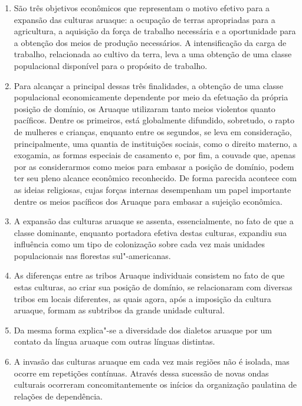 \begin{enumerate}
\def\labelenumi{\arabic{enumi}.}
\setcounter{enumi}{4}
\item
  São três objetivos econômicos que representam o motivo efetivo para a
  expansão das culturas aruaque: a ocupação de terras apropriadas para a
  agricultura, a aquisição da força de trabalho necessária e a
  oportunidade para a obtenção dos meios de produção necessários. A
  intensificação da carga de trabalho, relacionada ao cultivo da
  terra, leva a uma obtenção de uma classe populacional disponível para
  o propósito de trabalho.
\item
  Para alcançar a principal dessas três finalidades, a obtenção de uma
  classe populacional economicamente dependente por meio da efetuação da
  própria posição de domínio, os Aruaque utilizaram tanto meios
  violentos quanto pacíficos. Dentre os primeiros, está
  globalmente difundido, sobretudo, o rapto de mulheres e crianças,
  enquanto entre os segundos, se leva em consideração,
  principalmente, uma quantia de instituições sociais, como o direito
  materno, a exogamia, as formas especiais de casamento e, por fim, a
  couvade que, apenas por as considerarmos como meios para embasar a
  posição de domínio, podem ter seu pleno alcance econômico reconhecido.
  De forma parecida acontece com as ideias religiosas, cujas forças
  internas desempenham um papel importante dentre os meios pacíficos
  dos Aruaque para embasar a sujeição econômica.
\item
  A expansão das culturas aruaque se assenta, essencialmente, no fato de
  que a classe dominante, enquanto portadora efetiva destas culturas,
  expandiu sua influência como um tipo de colonização sobre cada vez
  mais unidades populacionais nas florestas sul"-americanas.
\item
  As diferenças entre as tribos Aruaque individuais consistem no fato de
  que estas culturas, ao criar sua posição de domínio, se
  relacionaram com diversas tribos em locais diferentes, as quais
  agora, após a imposição da cultura aruaque, formam as subtribos da grande unidade cultural.
\item
  Da mesma forma explica"-se a diversidade dos dialetos aruaque por um
  contato da língua aruaque com outras línguas distintas.
\item
  A invasão das culturas aruaque em cada vez mais regiões não é isolada,
  mas ocorre em repetições contínuas. Através dessa sucessão de novas
  ondas culturais ocorreram concomitantemente os inícios da organização
  paulatina de relações de dependência.

\end{enumerate}

